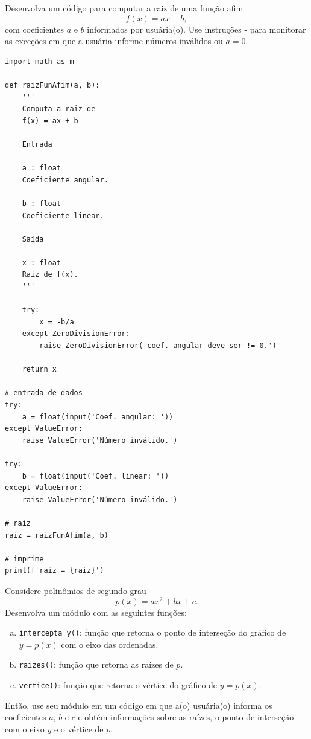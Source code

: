 \begin{exer}
  Desenvolva um código para computar a raiz de uma função afim
  \begin{equation}
    f(x) = ax + b,
  \end{equation}
  com coeficientes $a$ e $b$ informados por usuária(o). Use instruções {\PYTHONtry}-{\PYTHONexcept} para monitorar as exceções em que a usuária informe números inválidos ou $a=0$.
\end{exer}
\begin{resp}

\begin{lstlisting}
import math as m

def raizFunAfim(a, b):
    '''
    Computa a raiz de
    f(x) = ax + b

    Entrada
    -------
    a : float
    Coeficiente angular.

    b : float
    Coeficiente linear.

    Saída
    -----
    x : float
    Raiz de f(x).
    '''
    
    try:
        x = -b/a
    except ZeroDivisionError:
        raise ZeroDivisionError('coef. angular deve ser != 0.')

    return x

# entrada de dados
try:
    a = float(input('Coef. angular: '))
except ValueError:
    raise ValueError('Número inválido.')

try:
    b = float(input('Coef. linear: '))
except ValueError:
    raise ValueError('Número inválido.')

# raiz
raiz = raizFunAfim(a, b)

# imprime
print(f'raiz = {raiz}')
\end{lstlisting}

\end{resp}

\begin{exer}
  Considere polinômios de segundo grau
  \begin{equation}
    p(x) = ax^2 + bx + c.
  \end{equation}
  Desenvolva um módulo com as seguintes funções:
  \begin{enumerate}[a)]
  \item \lstinline+intercepta_y()+: função que retorna o ponto de interseção do gráfico de $y = p(x)$ com o eixo das ordenadas.
  \item \lstinline+raizes()+: função que retorna as raízes de $p$.
  \item \lstinline+vertice()+: função que retorna o vértice do gráfico de $y=p(x)$.
  \end{enumerate}
  Então, use seu módulo em um código em que a(o) usuária(o) informa os coeficientes $a$, $b$ e $c$ e obtém informações sobre as raízes, o ponto de interseção com o eixo $y$ e o vértice de $p$. 
\end{exer}

